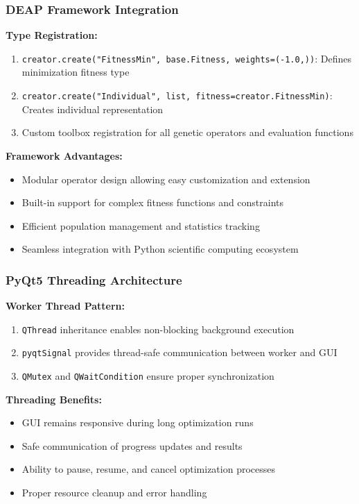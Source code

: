 \documentclass[12pt,a4paper]{article}
\begin{document}
\subsubsection{DEAP Framework Integration}
\textbf{Type Registration:}
\begin{enumerate}
\item \texttt{creator.create("FitnessMin", base.Fitness, weights=(-1.0,))}: Defines minimization fitness type
\item \texttt{creator.create("Individual", list, fitness=creator.FitnessMin)}: Creates individual representation
\item Custom toolbox registration for all genetic operators and evaluation functions
\end{enumerate}

\textbf{Framework Advantages:}
\begin{itemize}
\item Modular operator design allowing easy customization and extension
\item Built-in support for complex fitness functions and constraints
\item Efficient population management and statistics tracking
\item Seamless integration with Python scientific computing ecosystem
\end{itemize}

\subsubsection{PyQt5 Threading Architecture}
\textbf{Worker Thread Pattern:}
\begin{enumerate}
\item \texttt{QThread} inheritance enables non-blocking background execution
\item \texttt{pyqtSignal} provides thread-safe communication between worker and GUI
\item \texttt{QMutex} and \texttt{QWaitCondition} ensure proper synchronization
\end{enumerate}

\textbf{Threading Benefits:}
\begin{itemize}
\item GUI remains responsive during long optimization runs
\item Safe communication of progress updates and results
\item Ability to pause, resume, and cancel optimization processes
\item Proper resource cleanup and error handling
\end{itemize}
\end{document}
